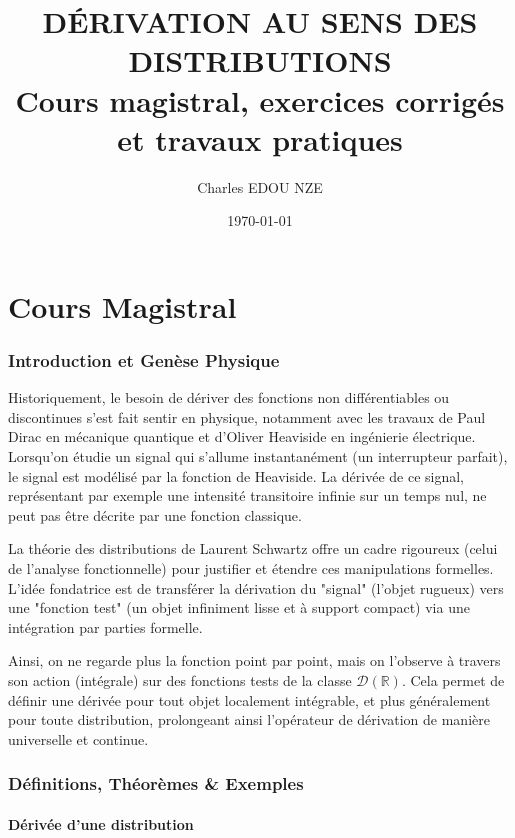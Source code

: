 \documentclass[11pt,a4paper]{article}
\title{\Huge DÉRIVATION AU SENS DES DISTRIBUTIONS \\ \large Cours magistral, exercices corrigés et travaux pratiques}
\author{\Large Charles EDOU NZE}
\date{\today}
\begin{document}
\maketitle
\tableofcontents
\newpage

\part{Cours Magistral}



\section{Introduction et Genèse Physique}

Historiquement, le besoin de dériver des fonctions non différentiables ou discontinues s'est fait sentir en physique, notamment avec les travaux de Paul Dirac en mécanique quantique et d'Oliver Heaviside en ingénierie électrique. Lorsqu'on étudie un signal qui s'allume instantanément (un interrupteur parfait), le signal est modélisé par la fonction de Heaviside. La dérivée de ce signal, représentant par exemple une intensité transitoire infinie sur un temps nul, ne peut pas être décrite par une fonction classique.

La théorie des distributions de Laurent Schwartz offre un cadre rigoureux (celui de l'analyse fonctionnelle) pour justifier et étendre ces manipulations formelles. L'idée fondatrice est de transférer la dérivation du "signal" (l'objet rugueux) vers une "fonction test" (un objet infiniment lisse et à support compact) via une intégration par parties formelle.

Ainsi, on ne regarde plus la fonction point par point, mais on l'observe à travers son action (intégrale) sur des fonctions tests de la classe $\mathcal{D}(\mathbb{R})$. Cela permet de définir une dérivée pour tout objet localement intégrable, et plus généralement pour toute distribution, prolongeant ainsi l'opérateur de dérivation de manière universelle et continue.

\section{Définitions, Théorèmes \& Exemples}

\subsection{Dérivée d'une distribution}
\end{document}
